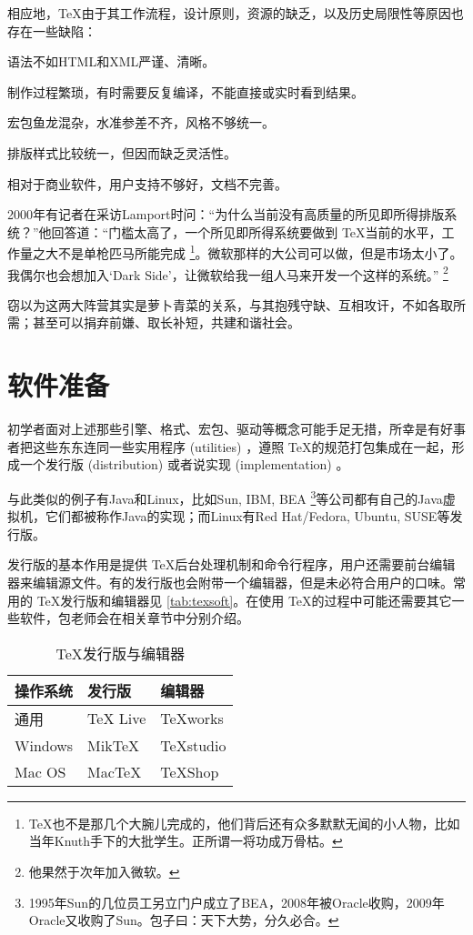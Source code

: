 相应地，\TeX 由于其工作流程，设计原则，资源的缺乏，以及历史局限性等原因也存在一些缺陷：
\begin{compactitem}
   \item 语法不如HTML和XML严谨、清晰。
   \item 制作过程繁琐，有时需要反复编译，不能直接或实时看到结果。
   \item 宏包鱼龙混杂，水准参差不齐，风格不够统一。
   \item 排版样式比较统一，但因而缺乏灵活性。
   \item 相对于商业软件，用户支持不够好，文档不完善。
\end{compactitem}

2000年有记者在采访Lamport时问：“为什么当前没有高质量的所见即所得排版系统？”他回答道：“门槛太高了，一个所见即所得系统要做到 \TeX 当前的水平，工作量之大不是单枪匹马所能完成 \footnote{\TeX 也不是那几个大腕儿完成的，他们背后还有众多默默无闻的小人物，比如当年Knuth手下的大批学生。正所谓一将功成万骨枯。}。微软那样的大公司可以做，但是市场太小了。我偶尔也会想加入‘Dark Side’，让微软给我一组人马来开发一个这样的系统。” \footnote{他果然于次年加入微软。}

窃以为这两大阵营其实是萝卜青菜的关系，与其抱残守缺、互相攻讦，不如各取所需；甚至可以捐弃前嫌、取长补短，共建和谐社会。

\section{软件准备}

初学者面对上述那些引擎、格式、宏包、驱动等概念可能手足无措，所幸是有好事者把这些东东连同一些实用程序 (utilities) ，遵照 \TeX 的规范打包集成在一起，形成一个发行版 (distribution) 或者说实现 (implementation) 。

与此类似的例子有Java和Linux，比如Sun, IBM, BEA \footnote{1995年Sun的几位员工另立门户成立了BEA，2008年被Oracle收购，2009年Oracle又收购了Sun。包子曰：天下大势，分久必合。}等公司都有自己的Java虚拟机，它们都被称作Java的实现；而Linux有Red Hat/Fedora, Ubuntu, SUSE等发行版。

发行版的基本作用是提供 \TeX 后台处理机制和命令行程序，用户还需要前台编辑器来编辑源文件。有的发行版也会附带一个编辑器，但是未必符合用户的口味。常用的 \TeX 发行版和编辑器见 \autoref{tab:texsoft}。在使用 \TeX 的过程中可能还需要其它一些软件，包老师会在相关章节中分别介绍。

\begin{table}[htbp]
\caption{\TeX 发行版与编辑器}
\label{tab:texsoft}
\centering
\begin{tabular}{lll}
   \toprule
    操作系统 & 发行版 & 编辑器 \\
   \midrule
    通用        & TeX Live  & TeXworks \\
    Windows     & MikTeX    & TeXstudio \\
    Mac OS      & MacTeX    & TeXShop \\

   \bottomrule
\end{tabular}
\end{table}

